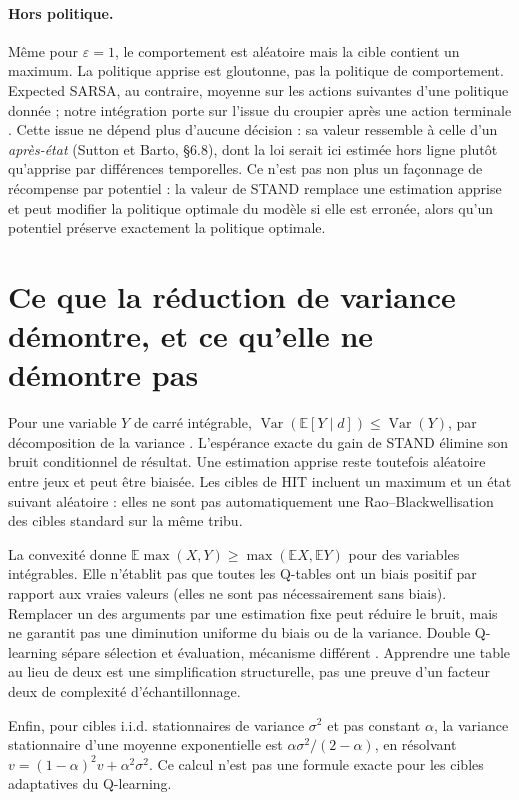 \documentclass[11pt,a4paper]{article}
\theoremstyle{remark}\newtheorem*{remarque}{Remarque}
\newcommand{\E}{\mathbb E}
\newcommand{\1}{\mathbf 1}
\begin{document}
\paragraph{Hors politique.} Même pour $\varepsilon=1$, le comportement est
aléatoire mais la cible contient un maximum. La politique apprise est gloutonne,
pas la politique de comportement. Expected SARSA, au contraire, moyenne sur
les actions suivantes d'une politique donnée \cite{expectedsarsa} ; notre intégration
porte sur l'issue du croupier après une action terminale \cite{suttonbarto}.
Cette issue ne dépend plus d'aucune décision : sa valeur ressemble à celle d'un
\emph{après-état} (Sutton et Barto, §6.8), dont la loi serait ici estimée hors
ligne plutôt qu'apprise par différences temporelles. Ce n'est pas non plus un
façonnage de récompense par potentiel \cite{shaping} : la valeur de STAND remplace
une estimation apprise et peut modifier la politique optimale du modèle si elle est
erronée, alors qu'un potentiel préserve exactement la politique optimale.

\section{Ce que la réduction de variance démontre, et ce qu'elle ne démontre pas}
Pour une variable $Y$ de carré intégrable,
$\operatorname{Var}(\E[Y\mid d])\le\operatorname{Var}(Y)$, par décomposition
de la variance \cite{blackwell}. L'espérance exacte du gain de STAND élimine
son bruit conditionnel de résultat. Une estimation apprise reste toutefois
aléatoire entre jeux et peut être biaisée. Les cibles de HIT incluent un maximum
et un état suivant aléatoire : elles ne sont pas automatiquement une
Rao--Blackwellisation des cibles standard sur la même tribu.

La convexité donne $\E\max(X,Y)\ge\max(\E X,\E Y)$ pour des variables
intégrables. Elle n'établit pas que toutes les Q-tables ont un biais positif
par rapport aux vraies valeurs (elles ne sont pas nécessairement sans biais).
Remplacer un des arguments par une estimation fixe peut réduire le bruit,
mais ne garantit pas une diminution uniforme du biais ou de la variance.
Double Q-learning sépare sélection et évaluation, mécanisme différent
\cite{doubleq}. Apprendre une table au lieu de deux est une simplification
structurelle, pas une preuve d'un facteur deux de complexité d'échantillonnage.

Enfin, pour cibles i.i.d. stationnaires de variance $\sigma^2$ et pas constant
$\alpha$, la variance stationnaire d'une moyenne exponentielle est
$\alpha\sigma^2/(2-\alpha)$, en résolvant
$v=(1-\alpha)^2v+\alpha^2\sigma^2$.
Ce calcul n'est pas une formule exacte pour les cibles adaptatives du Q-learning.
\end{document}

